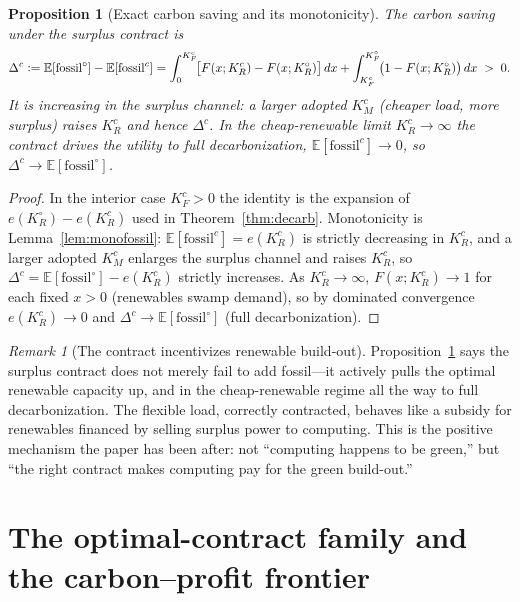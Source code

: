 \documentclass[11pt,reqno]{amsart}
\theoremstyle{plain}
\newtheorem{proposition}{Proposition}
\theoremstyle{definition}
\theoremstyle{remark}
\newtheorem{remark}{Remark}
\newcommand{\KRc}{K_R^{c}}
\newcommand{\KFc}{K_F^{c}}
\newcommand{\KMc}{K_M^{c}}
\newcommand{\KRo}{K_R^{\circ}}
\newcommand{\KFo}{K_F^{\circ}}
\newcommand{\E}{\mathbb{E}}
\newcommand{\eqdef}{\vcentcolon=}
\newcommand{\fossil}{\mathrm{fossil}}
\begin{document}
\begin{proposition}[Exact carbon saving and its monotonicity]\label{prop:saving}
The carbon saving under the surplus contract is
\begin{equation}\label{eq:exactsave}
  \Delta^{c}\eqdef\E[\fossil^{\circ}]-\E[\fossil^{c}]
  =\int_0^{\KFc}\!\!\big[F(x;\KRc)-F(x;\KRo)\big]\,dx
   +\int_{\KFc}^{\KFo}\!\!\big(1-F(x;\KRo)\big)\,dx \;>\;0 .
\end{equation}
It is increasing in the surplus channel: a larger adopted $\KMc$ (cheaper load, more
surplus) raises $\KRc$ and hence $\Delta^{c}$. In the cheap-renewable limit
$\KRc\to\infty$ the contract drives the utility to full decarbonization,
$\E[\fossil^{c}]\to0$, so $\Delta^{c}\to\E[\fossil^{\circ}]$.
\end{proposition}

\begin{proof}
In the interior case $\KFc>0$ the identity is the expansion of
$e(\KRo)-e(\KRc)$ used in Theorem~\ref{thm:decarb}. Monotonicity is
Lemma~\ref{lem:monofossil}: $\E[\fossil^{c}]=e(\KRc)$ is strictly decreasing in $\KRc$,
and a larger adopted $\KMc$ enlarges the surplus channel and raises $\KRc$, so
$\Delta^{c}=\E[\fossil^{\circ}]-e(\KRc)$ strictly increases. As $\KRc\to\infty$,
$F(x;\KRc)\to1$ for each fixed $x>0$ (renewables swamp demand), so by dominated
convergence $e(\KRc)\to0$ and $\Delta^{c}\to\E[\fossil^{\circ}]$ (full decarbonization).
\end{proof}

\begin{remark}[The contract incentivizes renewable build-out]
Proposition~\ref{prop:saving} says the surplus contract does not merely fail to add
fossil---it actively pulls the optimal renewable capacity up, and in the cheap-renewable
regime all the way to full decarbonization. The flexible load, correctly contracted,
behaves like a subsidy for renewables financed by selling surplus power to computing.
This is the positive mechanism the paper has been after: not ``computing happens to be
green,'' but ``the right contract makes computing pay for the green build-out.''
\end{remark}

\section{The optimal-contract family and the carbon--profit frontier}\label{sec:family}
\end{document}
